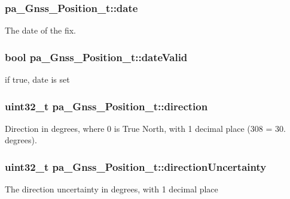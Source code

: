 \subsubsection[{\texorpdfstring{date}{date}}]{ pa\+\_\+\+Gnss\+\_\+\+Position\+\_\+t\+::date}\hypertarget{structpa___gnss___position__t_aa761a9e3307073d4a54c699635ed6c2c}{}\label{structpa___gnss___position__t_aa761a9e3307073d4a54c699635ed6c2c}


The date of the fix. 

\subsubsection[{\texorpdfstring{date\+Valid}{dateValid}}]{\setlength{\rightskip}{0pt plus 5cm}bool pa\+\_\+\+Gnss\+\_\+\+Position\+\_\+t\+::date\+Valid}\hypertarget{structpa___gnss___position__t_ab6005a21c11884b9f509f3582610ddc8}{}\label{structpa___gnss___position__t_ab6005a21c11884b9f509f3582610ddc8}


if true, date is set 

\subsubsection[{\texorpdfstring{direction}{direction}}]{\setlength{\rightskip}{0pt plus 5cm}uint32\+\_\+t pa\+\_\+\+Gnss\+\_\+\+Position\+\_\+t\+::direction}\hypertarget{structpa___gnss___position__t_addccf2b43c9aac8a1ee206a250c4ebe9}{}\label{structpa___gnss___position__t_addccf2b43c9aac8a1ee206a250c4ebe9}
Direction in degrees, where 0 is True North, with 1 decimal place (308 = 30. degrees). 
\subsubsection[{\texorpdfstring{direction\+Uncertainty}{directionUncertainty}}]{\setlength{\rightskip}{0pt plus 5cm}uint32\+\_\+t pa\+\_\+\+Gnss\+\_\+\+Position\+\_\+t\+::direction\+Uncertainty}\hypertarget{structpa___gnss___position__t_a3fd8bbfc2158b8daf226785248c31f70}{}\label{structpa___gnss___position__t_a3fd8bbfc2158b8daf226785248c31f70}
The direction uncertainty in degrees, with 1 decimal place 

